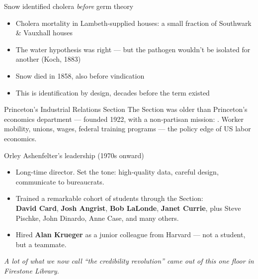 \documentclass[aspectratio=169,11pt]{beamer}
\begin{document}
\begin{frame}{Snow identified cholera \textit{before} germ theory}
\vspace{0.4em}
\begin{itemize}
  \item Cholera mortality in Lambeth-supplied houses: a small fraction of Southwark \& Vauxhall houses
  \item The water hypothesis was right --- but the pathogen wouldn't be isolated for another  (Koch, 1883)
  \item Snow died in 1858, also before vindication
  \item This is identification by design, decades before the term existed
\end{itemize}
\end{frame}


\begin{frame}{Princeton's Industrial Relations Section}
\footnotesize
The Section was older than Princeton's economics department --- founded 1922, with a non-partisan mission: . \;Worker mobility, unions, wages, federal training programs --- the policy edge of US labor economics.
\vspace{0.3em}
\begin{block}{Orley Ashenfelter's leadership (1970s onward)}
\begin{itemize}
  \item Long-time director. Set the tone: high-quality data, careful design, communicate to bureaucrats.
  \item Trained a remarkable cohort of students through the Section: \\
        \textbf{David Card}, \textbf{Josh Angrist}, \textbf{Bob LaLonde}, \textbf{Janet Currie}, plus Steve Pischke, John Dinardo, Anne Case, and many others.
  \item Hired \textbf{Alan Krueger} as a junior colleague from Harvard --- not a student, but a teammate.
\end{itemize}
\end{block}
\vspace{0.3em}
\begin{center}
\small\color{warmgray}\itshape
A lot of what we now call ``the credibility revolution'' came out of this one floor in Firestone Library.
\end{center}
\end{frame}
\end{document}
